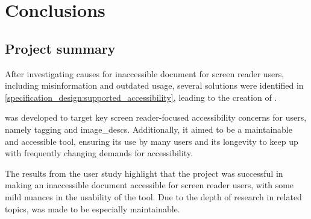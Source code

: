 \section{Conclusions}\label{conc}
\subsection{Project summary}
After investigating causes for inaccessible \latexspaced document for screen reader users, including misinformation and outdated \pdflatexspaced usage, several solutions were identified in \cref{specification_design:supported_accessibility}, leading to the creation of \lintex .

\lintexspaced was developed to target key screen reader-focused accessibility concerns for \latexspaced users, namely \gls{tagging} and \glspl{image_desc}. Additionally, it aimed to be a maintainable and accessible tool, ensuring its use by many users and its longevity to keep up with frequently changing demands for accessibility.

The results from the user study highlight that the project was successful in making an inaccessible document accessible for screen reader users, with some mild nuances in the usability of the tool. Due to the depth of research in related topics, \lintexspaced was made to be especially maintainable.

